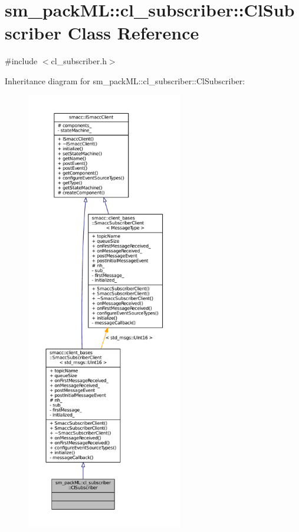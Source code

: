 \hypertarget{classsm__packML_1_1cl__subscriber_1_1ClSubscriber}{}\section{sm\+\_\+pack\+ML\+:\+:cl\+\_\+subscriber\+:\+:Cl\+Subscriber Class Reference}
\label{classsm__packML_1_1cl__subscriber_1_1ClSubscriber}


{\ttfamily \#include $<$cl\+\_\+subscriber.\+h$>$}



Inheritance diagram for sm\+\_\+pack\+ML\+:\+:cl\+\_\+subscriber\+:\+:Cl\+Subscriber\+:
\nopagebreak
\begin{figure}[H]
\begin{center}
\leavevmode
\includegraphics[height=550pt]{classsm__packML_1_1cl__subscriber_1_1ClSubscriber__inherit__graph}
\end{center}
\end{figure}


